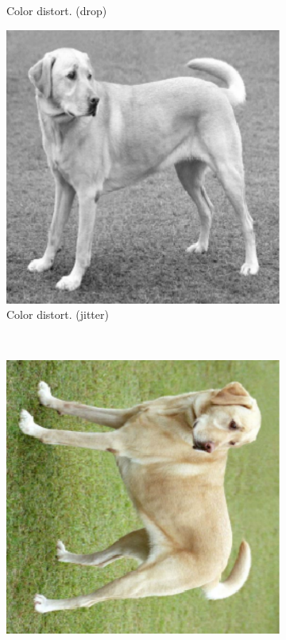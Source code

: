 \begin{figure}[th]
\begin{subfigure}{.19\textwidth}
  \caption{Color distort. (drop)}
\end{subfigure}\begin{subfigure}{.19\textwidth}
  \centering
  \includegraphics[width=0.9\linewidth]{chapters/assets/ssl_figs/transforms/img_color.pdf}
  \caption{Color distort. (jitter)}
\end{subfigure}\\
\begin{subfigure}{.19\textwidth}
  \centering
  \includegraphics[width=0.9\linewidth]{chapters/assets/ssl_figs/transforms/img_rotate.pdf}

\end{subfigure}
\end{figure}

